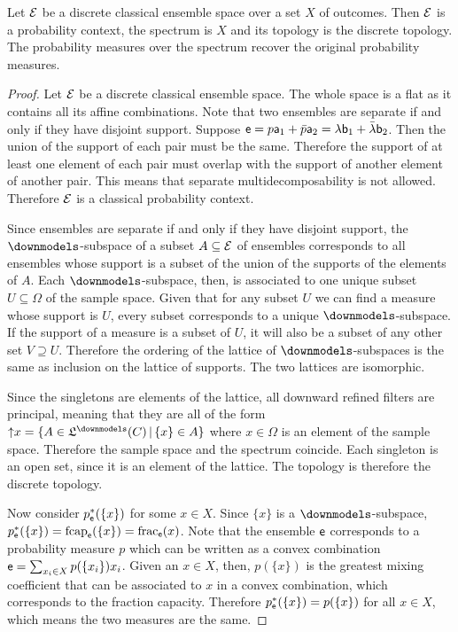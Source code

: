 \begin{mathSection}
	\begin{prop}
		Let $\Ens$ be a discrete classical ensemble space over a set $X$ of outcomes. Then $\Ens$ is a probability context, the spectrum is $X$ and its topology is the discrete topology. The probability measures over the spectrum recover the original probability measures.
	\end{prop}
	
	\begin{proof}
		Let $\Ens$ be a discrete classical ensemble space. The whole space is a flat as it contains all its affine combinations. Note that two ensembles are separate if and only if they have disjoint support. Suppose $\ens = p \ens[a]_1 + \bar{p} \ens[a]_2 = \lambda \ens[b]_1 + \bar{\lambda} \ens[b]_2$. Then the union of the support of each pair must be the same. Therefore the support of at least one element of each pair must overlap with the support of another element of another pair. This means that separate multidecomposability is not allowed. Therefore $\Ens$ is a classical probability context.
		
		Since ensembles are separate if and only if they have disjoint support, the $\separate$-subspace of a subset $A \subseteq \Ens$ of ensembles corresponds to all ensembles whose support is a subset of the union of the supports of the elements of $A$. Each $\separate$-subspace, then, is associated to one unique subset $U \subseteq \Omega$ of the sample space. Given that for any subset $U$ we can find a measure whose support is $U$, every subset corresponds to a unique $\separate$-subspace. If the support of a measure is a subset of $U$, it will also be a subset of any other set $V \supseteq U$. Therefore the ordering of the lattice of $\separate$-subspaces is the same as inclusion on the lattice of supports. The two lattices are isomorphic.
		
		Since the singletons are elements of the lattice, all downward refined filters are principal, meaning that they are all of the form $\uparrow\mathclose{x} = \{A \in \mathfrak{L}^\separate(C) \, | \, \{x\} \in A\}$ where $x \in \Omega$ is an element of the sample space. Therefore the sample space and the spectrum coincide. Each singleton is an open set, since it is an element of the lattice. The topology is therefore the discrete topology.
		
		Now consider $p^*_{\ens}(\{x\})$ for some $x \in X$. Since $\{x\}$ is a $\separate$-subspace, $p^*_{\ens}(\{x\}) = \fcap_{\ens}(\{x\}) = \size_{\ens}(x)$. Note that the ensemble $\ens$ corresponds to a probability measure $p$ which can be written as a convex combination $\ens = \sum_{x_i \in X} p(\{x_i\}) x_i$. Given an $x \in X$, then, $p(\{x\})$ is the greatest mixing coefficient that can be associated to $x$ in a convex combination, which corresponds to the fraction capacity. Therefore $p^*_{\ens}(\{x\}) = p(\{x\})$ for all $x \in X$, which means the two measures are the same.
	\end{proof}
\end{mathSection}

